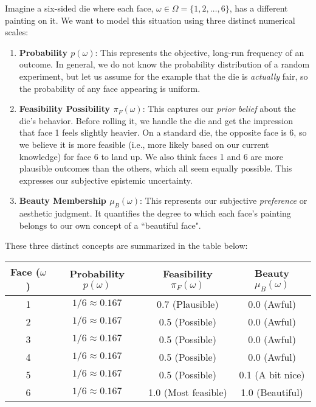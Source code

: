 \begin{example}
    
    Imagine a six-sided die where each face, $\omega \in \Omega = \{1, 2, \dots, 6\}$, has a different painting on it. We want to model this situation using three distinct numerical scales:
    
    \begin{enumerate}
        \item \textbf{Probability $p(\omega)$}: This represents the objective, long-run frequency of an outcome. In general, we do not know the probability distribution of a random experiment, but let us assume for the example that the die is \textit{actually} fair, so the probability of any face appearing is uniform.
        
        \item \textbf{Feasibility Possibility $\pi_F(\omega)$}: This captures our \textit{prior belief} about the die's behavior. Before rolling it, we handle the die and get the impression that face 1 feels slightly heavier. On a standard die, the opposite face is 6, so we believe it is more feasible (i.e., more likely based on our current knowledge) for face 6 to land up. We also think faces 1 and 6 are more plausible outcomes than the others, which all seem equally possible. This expresses our subjective epistemic uncertainty.
        
        \item \textbf{Beauty Membership $\mu_B(\omega)$}: This represents our subjective \textit{preference} or aesthetic judgment. It quantifies the degree to which each face's painting belongs to our own concept of a ``beautiful face".
    \end{enumerate}
    
    These three distinct concepts are summarized in the table below:
    
    \begin{center}
    \begin{tabular}{c|c|c|c}
        \textbf{Face ($\omega$)} & \textbf{Probability $p(\omega)$} & \textbf{Feasibility $\pi_F(\omega)$} & \textbf{Beauty $\mu_B(\omega)$} \\
        \hline
        1 & $1/6 \approx 0.167$ & 0.7 (Plausible) & 0.0 (Awful) \\
        2 & $1/6 \approx 0.167$ & 0.5 (Possible) & 0.0 (Awful) \\
        3 & $1/6 \approx 0.167$ & 0.5 (Possible) & 0.0 (Awful) \\
        4 & $1/6 \approx 0.167$ & 0.5 (Possible) & 0.0 (Awful) \\
        5 & $1/6 \approx 0.167$ & 0.5 (Possible) & 0.1 (A bit nice) \\
        6 & $1/6 \approx 0.167$ & 1.0 (Most feasible) & 1.0 (Beautiful) \\
    \end{tabular}
    \end{center}
    

\end{example}
